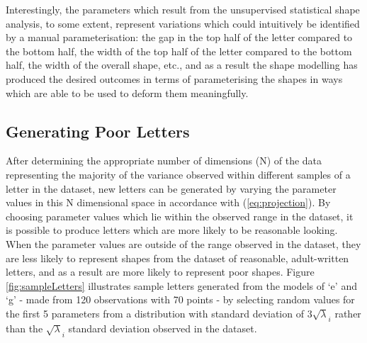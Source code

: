\documentclass{sig-alternate}
\begin{document}
Interestingly, the parameters which result from the unsupervised statistical
shape analysis, to some extent, represent variations which could intuitively be
identified by a manual parameterisation: the gap in the top half of the letter
compared to the bottom half, the width of the top half of the letter compared to
the bottom half, the width of the overall shape, etc., and as a result the shape
modelling has produced the desired outcomes in terms of parameterising the
shapes in ways which are able to be used to deform them meaningfully.


\subsection{Generating Poor Letters}

After determining the appropriate number of dimensions (N) of the data
representing the majority of the variance observed within different samples of a
letter in the dataset, new letters can be generated by varying the parameter
values in this N dimensional space in accordance with (\ref{eq:projection}). By
choosing parameter values which lie within the observed range in the dataset, it
is possible to produce letters which are more likely to be reasonable looking.
When the parameter values are outside of the range observed in the dataset, they
are less likely to represent shapes from the dataset of reasonable,
adult-written letters, and as a result are more likely to represent poor shapes.
Figure \ref{fig:sampleLetters} illustrates sample letters generated from the
models of `e' and `g' - made from 120 observations with 70 points - by selecting
random values for the first 5 parameters from a distribution with standard
deviation of $3\sqrt\lambda_i$ rather than the $\sqrt\lambda_i$ standard
deviation observed in the dataset.
\end{document}
